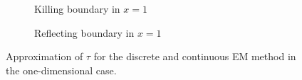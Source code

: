 \begin{figure}[t]
    \centering
    \begin{subfigure}{0.49\linewidth}
        \centering
        \resizebox{1\linewidth}{!}{ }  
        \caption{Killing boundary in $x = 1$}
        \label{fig:ApproxOneD}
    \end{subfigure}
    \begin{subfigure}{0.49\linewidth}
        \centering
        \resizebox{1\linewidth}{!}{ }  
        \caption{Reflecting boundary in $x = 1$}
        \label{fig:ApproxOneD}
    \end{subfigure}    
    \caption{Approximation of $\tau$ for the discrete and continuous EM method in the one-dimensional case.}
    \label{fig:ApproxOneD}
\end{figure}
